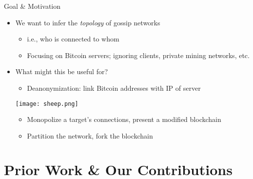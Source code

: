 \documentclass{beamer}
\begin{document}
\begin{frame}{Goal \& Motivation}
\begin{itemize}
    \item We want to infer the \textit{topology} of gossip networks\pause
    \begin{itemize}
        \item i.e., who is connected to whom \pause
        \item Focusing on Bitcoin servers; ignoring clients, private mining networks, etc. \pause
    \end{itemize}
    \item What might this be useful for? \pause
    \begin{itemize}
        \item Deanonymization: link Bitcoin addresses with IP of server \pause
    \end{itemize}
\begin{center}\texttt{[image: sheep.png]}\end{center}\pause
    \begin{itemize}
        \item Monopolize a target's connections, present a modified blockchain \pause
        \item Partition the network, fork the blockchain
    \end{itemize}
\end{itemize}
\end{frame}

\section{Prior Work \& Our Contributions}
\end{document}
